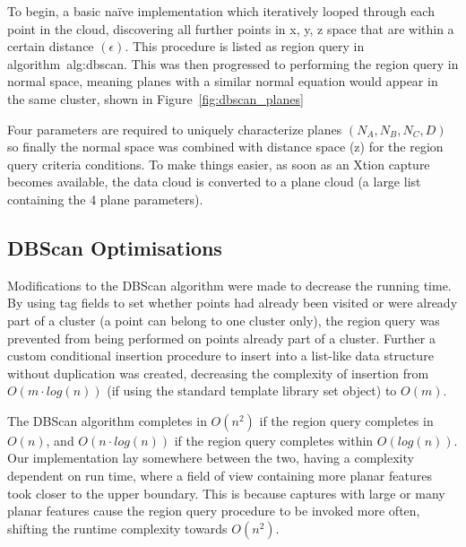 \documentclass[]{article}
\begin{document}
{To begin, a basic naïve implementation which iteratively looped through each point in the cloud, discovering all further points in x, y, z space that are within a certain distance  $(\epsilon)$. This procedure is listed as region query in algorithm~{alg:dbscan}. This was then progressed to performing the region query in normal space, meaning planes with a similar normal equation would appear in the same cluster, shown in Figure~\ref{fig:dbscan_planes}



Four parameters are required to uniquely characterize planes $(N_A, N_B, N_C, D)$ so finally the normal space was combined with distance space (z) for the region query criteria conditions. To make things easier, as soon as an Xtion capture becomes available, the data cloud is converted to a plane cloud (a large list  containing the 4 plane parameters).

\subsection{DBScan Optimisations} %
\label{sub:dbscan_optimisations}


Modifications to the DBScan algorithm were made to decrease the running time. By using tag fields to set whether points had already been visited or were already part of a cluster (a point can belong to one cluster only), the region query was prevented from being performed on points already part of a cluster. Further a  custom conditional insertion procedure to insert into a list-like data structure without duplication was created, decreasing the complexity of insertion from $O(m \cdot log(n))$ (if using the standard template library set object) to $O(m)$.

The DBScan algorithm completes in $O(n^2)$ if the region query completes in $O(n)$, and $O(n \cdot log(n))$ if the region query completes within $O(log(n))$. Our implementation lay somewhere between the two, having a complexity dependent on run time, where a field of view containing more planar features took closer to the upper boundary. This is because captures with large or many planar features cause the region query procedure to be invoked more often, shifting the runtime complexity towards $O(n^2)$.

}
\end{document}
